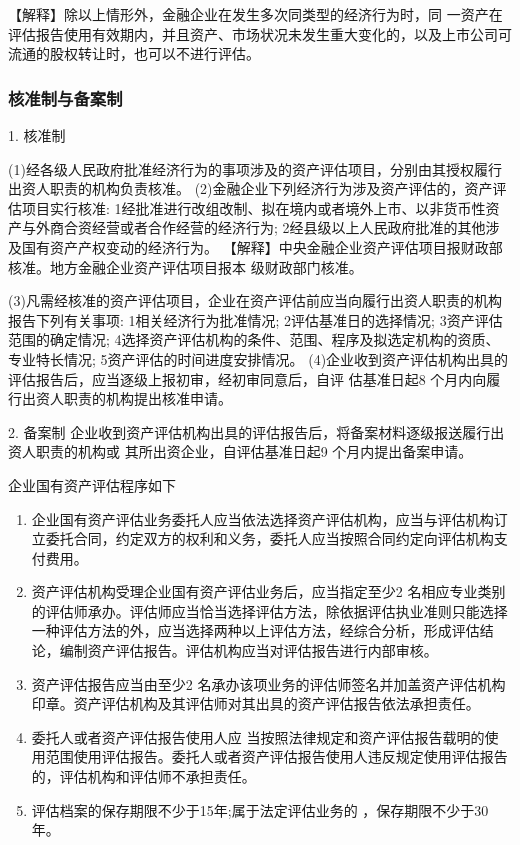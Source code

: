 \documentclass[UTF8,12pt]{ctexart}
\numberwithin{equation}{section} %
\numberwithin{figure}{section}
\numberwithin{table}{section}
\begin{document}
	【解释】除以上情形外，金融企业在发生多次同类型的经济行为时，同 一资产在评估报告使用有效期内，并且资产、市场状况未发生重大变化的，以及上市公司可流通的股权转让时，也可以不进行评估。
	
	\subsubsection{核准制与备案制}
	1. 核准制
	
	(1)经各级人民政府批准经济行为的事项涉及的资产评估项目，分别由其授权履行出资人职责的机构负责核准。
	(2)金融企业下列经济行为涉及资产评估的，资产评估项目实行核准:
	1经批准进行改组改制、拟在境内或者境外上市、以非货币性资产与外商合资经营或者合作经营的经济行为;
	2经县级以上人民政府批准的其他涉及国有资产产权变动的经济行为。
	【解释】中央金融企业资产评估项目报财政部核准。地方金融企业资产评估项目报本
	级财政部门核准。
	
	(3)凡需经核准的资产评估项目，企业在资产评估前应当向履行出资人职责的机构报告下列有关事项:
	1相关经济行为批准情况;
	2评估基准日的选择情况;
	3资产评估范围的确定情况;
	4选择资产评估机构的条件、范围、程序及拟选定机构的资质、 专业特长情况;
	5资产评估的时间进度安排情况。
	(4)企业收到资产评估机构出具的评估报告后，应当逐级上报初审，经初审同意后，自评
	估基准日起8 个月内向履行出资人职责的机构提出核准申请。
	
	2. 备案制
	企业收到资产评估机构出具的评估报告后，将备案材料逐级报送履行出资人职责的机构或
	其所出资企业，自评估基准日起9 个月内提出备案申请。
	
	企业国有资产评估程序如下
	\begin{enumerate}
		\item 企业国有资产评估业务委托人应当依法选择资产评估机构，应当与评估机构订立委托合同，约定双方的权利和义务，委托人应当按照合同约定向评估机构支付费用。
		
		\item 资产评估机构受理企业国有资产评估业务后，应当指定至少2 名相应专业类别的评估师承办。评估师应当恰当选择评估方法，除依据评估执业准则只能选择一种评估方法的外，应当选择两种以上评估方法，经综合分析，形成评估结论，编制资产评估报告。评估机构应当对评估报告进行内部审核。
		
		\item 资产评估报告应当由至少2 名承办该项业务的评估师签名并加盖资产评估机构印章。资产评估机构及其评估师对其出具的资产评估报告依法承担责任。
		
		\item 委托人或者资产评估报告使用人应 当按照法律规定和资产评估报告载明的使用范围使用评估报告。委托人或者资产评估报告使用人违反规定使用评估报告的，评估机构和评估师不承担责任。
		
		\item 评估档案的保存期限不少于15年;属于法定评估业务的 ，保存期限不少于30年。
	\end{enumerate}
	
\end{document}

